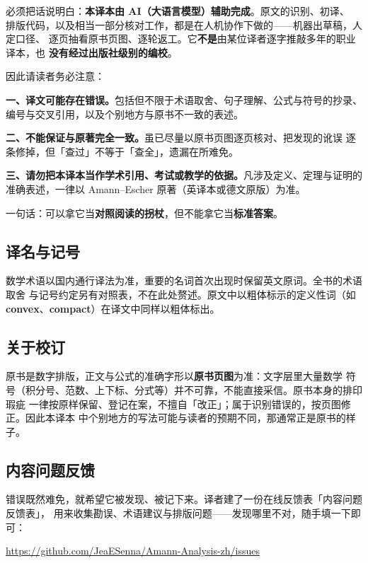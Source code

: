 必须把话说明白：\textbf{本译本由 AI（大语言模型）辅助完成}。原文的识别、初译、
排版代码，以及相当一部分核对工作，都是在人机协作下做的——机器出草稿，人定口径、
逐页抽看原书页图、逐轮返工。它\textbf{不是}由某位译者逐字推敲多年的职业译本，也
\textbf{没有经过出版社级别的编校}。

因此请读者务必注意：

\textbf{一、译文可能存在错误。}包括但不限于术语取舍、句子理解、公式与符号的抄录、
编号与交叉引用，以及个别地方与原书不一致的表述。

\textbf{二、不能保证与原著完全一致。}虽已尽量以原书页图逐页核对、把发现的讹误
逐条修掉，但「查过」不等于「查全」，遗漏在所难免。

\textbf{三、请勿把本译本当作学术引用、考试或教学的依据。}凡涉及定义、定理与证明的
准确表述，一律以 Amann--Escher 原著（英译本或德文原版）为准。

一句话：可以拿它当\textbf{对照阅读的拐杖}，但不能拿它当\textbf{标准答案}。

\subsection*{译名与记号}

数学术语以国内通行译法为准，重要的名词首次出现时保留英文原词。全书的术语取舍
与记号约定另有对照表，不在此处赘述。原文中以粗体标示的定义性词（如
\textbf{convex}、\textbf{compact}）在译文中同样以粗体标出。

\subsection*{关于校订}

原书是数字排版，正文与公式的准确字形以\textbf{原书页图}为准：文字层里大量数学
符号（积分号、范数、上下标、分式等）并不可靠，不能直接采信。原书本身的排印瑕疵
一律按原样保留、登记在案，不擅自「改正」；属于识别错误的，按页图修正。因此本译本
中个别地方的写法可能与读者的预期不同，那通常正是原书的样子。

\subsection*{内容问题反馈}

错误既然难免，就希望它被发现、被记下来。译者建了一份在线反馈表「内容问题反馈表」，
用来收集勘误、术语建议与排版问题——发现哪里不对，随手填一下即可：

\begin{center}
\url{https://github.com/JeaESenna/Amann-Analysis-zh/issues}
\end{center}



